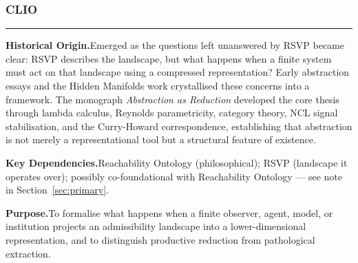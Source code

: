 \documentclass[12pt, twoside]{article}
\newcommand{\frameworkhead}[5]{  \subsubsection{#1}
  \noindent\textcolor{#2}{\rule{\linewidth}{0.8pt}}
  \smallskip

  \noindent\textbf{Historical Origin.}\quad #3

  \noindent\textbf{Key Dependencies.}\quad #4

  \noindent\textbf{Purpose.}\quad #5
}
\begin{document}
\frameworkhead{CLIO}{cliogreen}{Emerged as the questions left unanswered by RSVP became clear: RSVP
describes the landscape, but what happens when a finite system must act on
that landscape using a compressed representation? Early abstraction essays
and the Hidden Manifolds work crystallised these concerns into a framework.
The monograph \emph{Abstraction as Reduction} developed the core thesis
through lambda calculus, Reynolds parametricity, category theory, NCL signal
stabilisation, and the Curry-Howard correspondence, establishing that
abstraction is not merely a representational tool but a structural feature
of existence.}{Reachability Ontology (philosophical); RSVP (landscape it operates over);
possibly co-foundational with Reachability Ontology — see note in
Section~\ref{sec:primary}.}{To formalise what happens when a finite observer, agent, model, or
institution projects an admissibility landscape into a lower-dimensional
representation, and to distinguish productive reduction from pathological
extraction.}
\end{document}

